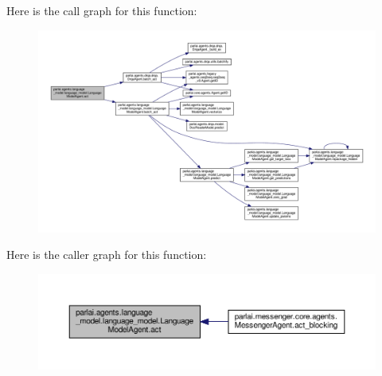 Here is the call graph for this function\+:
\nopagebreak
\begin{figure}[H]
\begin{center}
\leavevmode
\includegraphics[width=350pt]{classparlai_1_1agents_1_1language__model_1_1language__model_1_1LanguageModelAgent_a0f8d50e5423b4f34ab5d078d6185e4b2_cgraph}
\end{center}
\end{figure}
Here is the caller graph for this function\+:
\nopagebreak
\begin{figure}[H]
\begin{center}
\leavevmode
\includegraphics[width=350pt]{classparlai_1_1agents_1_1language__model_1_1language__model_1_1LanguageModelAgent_a0f8d50e5423b4f34ab5d078d6185e4b2_icgraph}
\end{center}
\end{figure}
\mbox{\label{classparlai_1_1agents_1_1language__model_1_1language__model_1_1LanguageModelAgent_a935ed616ff38d97e918adb2345386631}} 
